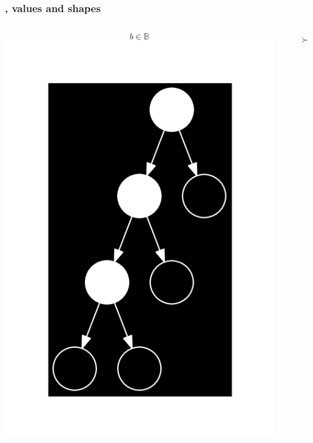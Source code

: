 \begin{frame}

\frametitle{\D{}, values and shapes}

\begin{columns}

\begin{center}
$$b\in\mathbb{B}$$
\includegraphics[scale=0.5]{figures/value}
\end{center}

\begin{flushright}
\cite{comp}
\end{flushright}


\begin{center}
{\fontsize{40}{20}$\succ$}
\end{center}



\end{columns}
\end{frame}
